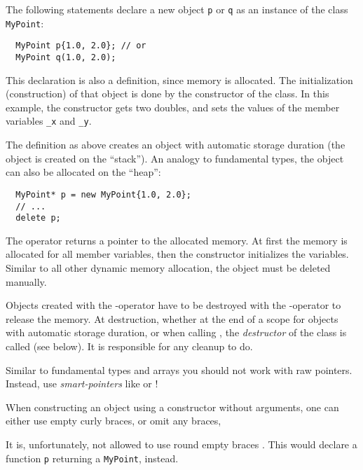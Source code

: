 The following statements declare a new object \texttt{p} or \texttt{q} as an instance of the class \texttt{MyPoint}:
%
\begin{verbatim}
  MyPoint p{1.0, 2.0}; // or
  MyPoint q(1.0, 2.0);
\end{verbatim}
%
This declaration is also a definition, since memory is allocated. The initialization (construction) of that object is done by the constructor of the class.
In this example, the constructor gets two doubles, and sets the values of the member variables \texttt{\_x} and \texttt{\_y}.

The definition as above creates an object with automatic storage duration (\ie the object is created on the ``stack''). An analogy to fundamental types,
the object can also be allocated on the ``heap'':
%
\begin{verbatim}
  MyPoint* p = new MyPoint{1.0, 2.0};
  // ...
  delete p;
\end{verbatim}
The operator  returns a pointer to the allocated memory. At first the memory is allocated for all member variables, then the constructor initializes
the variables. Similar to all other dynamic memory allocation, the object must be deleted manually.

Objects created with the -operator have to be destroyed with the -operator to release the memory. At destruction, whether at the end of
a scope for objects with automatic storage duration, or when calling , the \emph{destructor} of the class is called (see below). It is responsible
for any cleanup to do.

\begin{rem}
  Similar to fundamental types and arrays you should not work with raw pointers. Instead, use \emph{smart-pointers} like  or !
\end{rem}

\begin{rem}
  When constructing an object using a constructor without arguments, one can either use empty curly braces, \ie
  or omit any braces, \ie

  It is, unfortunately, not allowed to use round empty braces . This would declare a function \texttt{p} returning a \texttt{MyPoint}, instead.
\end{rem}


